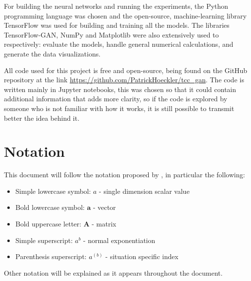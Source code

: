 For building the neural networks and running the experiments, the Python programming language was chosen and the open-source, machine-learning library TensorFlow \cite{tensorflow2015} was used for building and training all the models. The libraries TensorFlow-GAN, NumPy and Matplotlib were also extensively used to respectively: evaluate the models, handle general numerical calculations, and generate the data visualizations.

All code used for this project is free and open-source, being found on the GitHub repository at the link \url{https://github.com/PatrickHoeckler/tcc_gan}. The code is written mainly in Jupyter notebooks, this was chosen so that it could contain additional information that adds more clarity, so if the code is explored by someone who is not familiar with how it works, it is still possible to transmit better the idea behind it.


\section{Notation}
This document will follow the notation proposed by \cite[p. xiii-xvi]{deepLearningBook2016}, in particular the following:
\begin{itemize}
    \item Simple lowercase symbol: $a$ - single dimension scalar value
    \item Bold lowercase symbol: $\bm{a}$ - vector
    \item Bold uppercase letter: $\bm{A}$ - matrix
    \item Simple superscript: $a^b$ - normal exponentiation
    \item Parenthesis superscript: $a^{(b)}$ - situation specific index
\end{itemize}

Other notation will be explained as it appears throughout the document.

